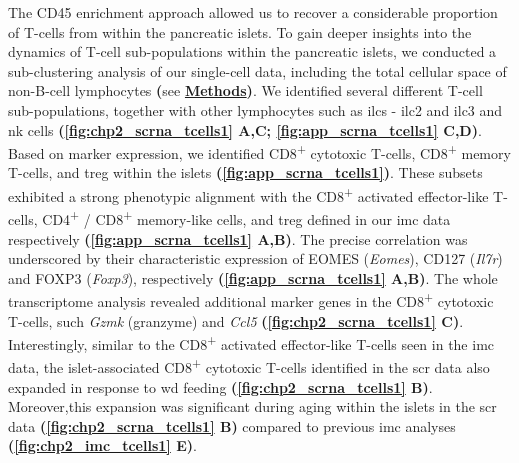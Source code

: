 
\par The CD45 enrichment approach allowed us to recover a considerable proportion of T-cells from within the pancreatic islets. To gain deeper insights into the dynamics of T-cell sub-populations within the pancreatic islets, we conducted a sub-clustering analysis of our single-cell data, including the total cellular space of non-B-cell lymphocytes \textbf{(}see \hyperref[subsubsec:met_chp2_immuneendo]{\textbf{Methods}}\textbf{)}. We identified several different T-cell sub-populations, together with other lymphocytes such as \glspl{ilc} -  \gls{ilc}2 and \gls{ilc}3 and \gls{nk} cells \textbf{(\autoref{fig:chp2_scrna_tcells1} A,C; \autoref{fig:app_scrna_tcells1} C,D)}. %
Based on marker expression, we identified  CD8\textsuperscript{+} cytotoxic T-cells, CD8\textsuperscript{+} memory T-cells, and \gls{treg} within the islets \textbf{(\autoref{fig:app_scrna_tcells1})}. These subsets exhibited a strong phenotypic alignment with the CD8\textsuperscript{+} activated effector-like T-cells, CD4\textsuperscript{+} / CD8\textsuperscript{+} memory-like cells, and \gls{treg} defined in our \gls{imc} data respectively \textbf{(\autoref{fig:app_scrna_tcells1} A,B)}. The precise correlation was underscored by their characteristic expression of EOMES (\textit{Eomes}), CD127 (\textit{Il7r}) and FOXP3 (\textit{Foxp3}), respectively \textbf{(\autoref{fig:app_scrna_tcells1} A,B)}. The whole transcriptome analysis revealed additional marker genes in the CD8\textsuperscript{+} cytotoxic T-cells, such \textit{Gzmk} (granzyme) and \textit{Ccl5} \textbf{(\autoref{fig:chp2_scrna_tcells1} C)}. Interestingly, similar to the CD8\textsuperscript{+} activated effector-like T-cells seen in the \gls{imc} data, the islet-associated CD8\textsuperscript{+} cytotoxic T-cells identified in the \gls{scr} data also expanded in response to \gls{wd} feeding \textbf{(\autoref{fig:chp2_scrna_tcells1} B)}. Moreover,this expansion was significant during aging within the islets in the \gls{scr} data \textbf{(\autoref{fig:chp2_scrna_tcells1} B)} compared to previous \gls{imc} analyses \textbf{(\autoref{fig:chp2_imc_tcells1} E)}.\\

